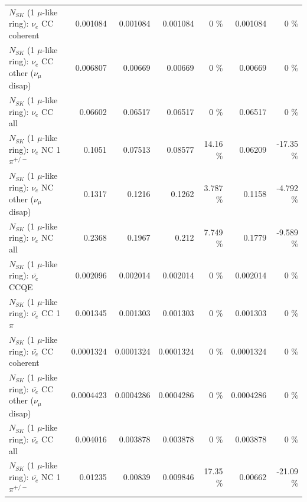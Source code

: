 \begin{table}
\begin{tabular}{| l | r | r | r  r | r  r |}
                               $N_{SK}$ (1 $\mu$-like ring): $\nu_e$ CC coherent &        0.001084 &        0.001084 &        0.001084 &        0 \%  &        0.001084 &        0 \%  \\ 
                $N_{SK}$ (1 $\mu$-like ring): $\nu_e$ CC other ($\nu_\mu$ disap) &        0.006807 &         0.00669 &         0.00669 &        0 \%  &         0.00669 &        0 \%  \\ 
                                  $N_{SK}$ (1 $\mu$-like ring): $\nu_{e}$ CC all &         0.06602 &         0.06517 &         0.06517 &        0 \%  &         0.06517 &        0 \%  \\ 
\hline
                           $N_{SK}$ (1 $\mu$-like ring): $\nu_e$ NC 1$\pi^{+/-}$ &          0.1051 &         0.07513 &         0.08577 &    14.16 \%  &         0.06209 &   -17.35 \%  \\ 
                $N_{SK}$ (1 $\mu$-like ring): $\nu_e$ NC other ($\nu_\mu$ disap) &          0.1317 &          0.1216 &          0.1262 &    3.787 \%  &          0.1158 &   -4.792 \%  \\ 
                                  $N_{SK}$ (1 $\mu$-like ring): $\nu_{e}$ NC all &          0.2368 &          0.1967 &           0.212 &    7.749 \%  &          0.1779 &   -9.589 \%  \\ 
\hline
\hline
\hline
                                $N_{SK}$ (1 $\mu$-like ring): $\bar{\nu_e}$ CCQE &        0.002096 &        0.002014 &        0.002014 &        0 \%  &        0.002014 &        0 \%  \\ 
                           $N_{SK}$ (1 $\mu$-like ring): $\bar{\nu_e}$ CC 1$\pi$ &        0.001345 &        0.001303 &        0.001303 &        0 \%  &        0.001303 &        0 \%  \\ 
                         $N_{SK}$ (1 $\mu$-like ring): $\bar{\nu_e}$ CC coherent &       0.0001324 &       0.0001324 &       0.0001324 &        0 \%  &       0.0001324 &        0 \%  \\ 
          $N_{SK}$ (1 $\mu$-like ring): $\bar{\nu_e}$ CC other ($\nu_\mu$ disap) &       0.0004423 &       0.0004286 &       0.0004286 &        0 \%  &       0.0004286 &        0 \%  \\ 
                            $N_{SK}$ (1 $\mu$-like ring): $\bar{\nu_{e}}$ CC all &        0.004016 &        0.003878 &        0.003878 &        0 \%  &        0.003878 &        0 \%  \\ 
\hline
                     $N_{SK}$ (1 $\mu$-like ring): $\bar{\nu_e}$ NC 1$\pi^{+/-}$ &         0.01235 &         0.00839 &        0.009846 &    17.35 \%  &         0.00662 &   -21.09 \%  \\ 

\end{tabular}
\end{table}
